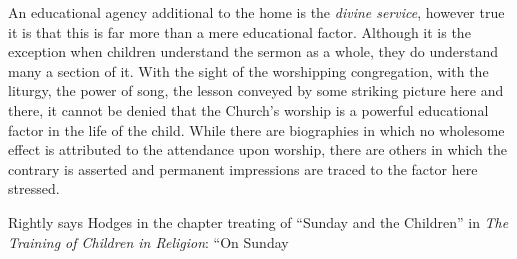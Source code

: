 An educational agency additional to the home is the \emph{divine service}, however true it is that this is far more than a mere educational factor. Although it is the exception when children understand the sermon as a whole, they do understand many a section of it. With the sight of the worshipping congregation, with the liturgy, the power of song, the lesson conveyed by some striking picture here and there, it cannot be denied that the Church’s worship is a powerful educational factor in the life of the child. While there are biographies in which no wholesome effect is attributed to the attendance upon worship, there are others in which the contrary is asserted and permanent impressions are traced to the factor here stressed.

Rightly says Hodges in the chapter treating of “Sunday and the Children” in \emph{The Training of Children in Religion}: “On Sunday
